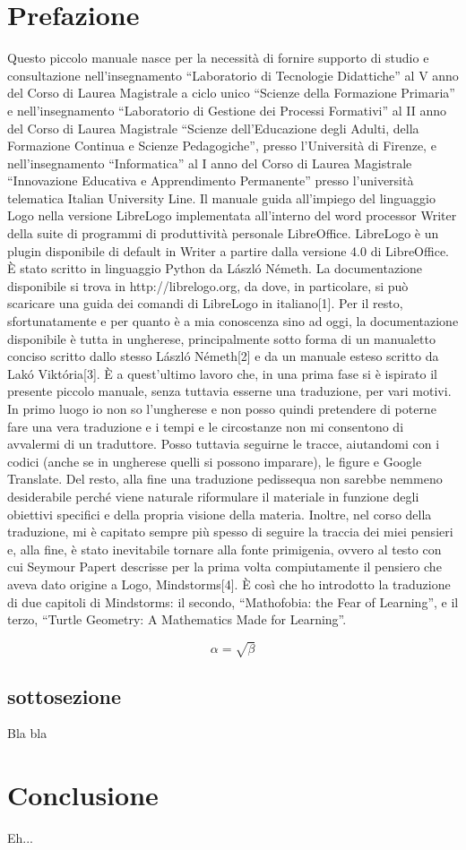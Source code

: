 \section{Prefazione}
Questo piccolo manuale nasce per la necessità di fornire supporto di studio e consultazione nell'insegnamento “Laboratorio di Tecnologie Didattiche” al V anno del Corso di Laurea Magistrale a ciclo unico “Scienze della Formazione Primaria” e nell'insegnamento “Laboratorio di Gestione dei Processi Formativi” al II anno del Corso di Laurea Magistrale “Scienze dell'Educazione degli Adulti, della Formazione Continua e Scienze Pedagogiche”, presso l'Università di Firenze, e nell'insegnamento “Informatica” al I anno del Corso di Laurea Magistrale “Innovazione Educativa e Apprendimento Permanente” presso l'università telematica Italian University Line. Il manuale guida all'impiego del linguaggio Logo nella versione LibreLogo implementata all'interno del word processor Writer della suite di programmi di produttività personale LibreOffice. LibreLogo è un plugin disponibile di default in Writer a partire dalla versione 4.0 di LibreOffice. È stato scritto in linguaggio Python da László Németh. La documentazione disponibile si trova in http://librelogo.org, da dove, in particolare, si può scaricare una guida dei comandi di LibreLogo in italiano[1]. Per il resto, sfortunatamente e per quanto è a mia conoscenza sino ad oggi, la documentazione disponibile è tutta in ungherese, principalmente sotto forma di un manualetto conciso scritto dallo stesso László Németh[2] e da un manuale esteso scritto da Lakó Viktória[3]. È a quest'ultimo lavoro che, in una prima fase si è ispirato il presente piccolo manuale, senza tuttavia esserne una traduzione, per vari motivi. In primo luogo io non so l'ungherese e non posso quindi pretendere di poterne fare una vera traduzione e i tempi e le circostanze non mi consentono di avvalermi di un traduttore. Posso tuttavia seguirne le tracce, aiutandomi con i codici (anche se in ungherese quelli si possono imparare), le figure e Google Translate. Del resto, alla fine una traduzione pedissequa non sarebbe nemmeno desiderabile perché viene naturale riformulare il materiale in funzione degli obiettivi specifici e della propria visione della materia. Inoltre, nel corso della traduzione, mi è capitato sempre più spesso di seguire la traccia dei miei pensieri e, alla fine, è stato inevitabile tornare alla fonte primigenia, ovvero al testo con cui Seymour Papert descrisse per la prima volta compiutamente il pensiero che aveva dato origine a Logo, Mindstorms[4]. È così che ho introdotto la traduzione di due capitoli di Mindstorms: il secondo, “Mathofobia: the Fear of Learning”, e il terzo, “Turtle Geometry: A Mathematics Made for Learning”.

\begin{equation}
	    \label{simple_equation}
	        \alpha = \sqrt{ \beta }
\end{equation}

\subsection{sottosezione}
Bla bla


\section{Conclusione}
Eh...

